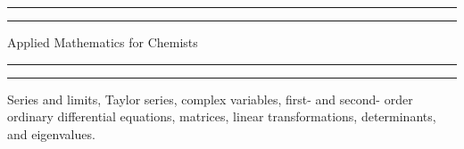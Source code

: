 


\begin{titlepage} %

	\centering %
	
	\scshape %
	
	\vspace*{\baselineskip} %
	
	
	\rule{\textwidth}{1.6pt}\vspace*{-\baselineskip}\vspace*{2pt} %
	\rule{\textwidth}{0.4pt} %
	
	\vspace{\baselineskip} %
	
	{\LARGE Applied Mathematics for Chemists} %
	
	\vspace{0.3\baselineskip} %
	
	\rule{\textwidth}{0.4pt}\vspace*{-\baselineskip}\vspace{3.2pt} %
	\rule{\textwidth}{1.6pt} %
	
	\vspace{2\baselineskip} %
	
	
	Series and limits, Taylor series, complex variables, first- and second- order ordinary differential equations, matrices, linear transformations, determinants, and eigenvalues. %
	
	\vspace*{3\baselineskip} %
	
	

\end{titlepage}
